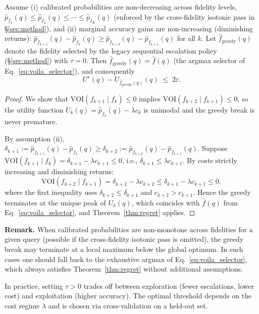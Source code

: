 \begin{corollary}
\label{cor:greedy_regret}
Assume (i) calibrated probabilities are non-decreasing across fidelity levels,
$\hat p_{f_1}(q) \le \hat p_{f_2}(q) \le \cdots \le \hat p_{f_K}(q)$
(enforced by the cross-fidelity isotonic pass in \S\ref{sec:method}),
and (ii) marginal accuracy gains are non-increasing (diminishing returns):
$\hat p_{f_{k+1}}(q) - \hat p_{f_k}(q) \ge \hat p_{f_{k+2}}(q) - \hat p_{f_{k+1}}(q)$
for all $k$.
Let $\hat f_{\text{greedy}}(q)$ denote the fidelity selected by the legacy
sequential escalation policy (\S\ref{sec:method})
with $\tau = 0$. Then $\hat f_{\text{greedy}}(q) = \hat f(q)$ (the argmax selector of
Eq.~\eqref{eq:voila_selector}), and consequently
\[
U^\star(q) - U_{\hat f_{\text{greedy}}(q)}(q)
\;\le\;
2\varepsilon.
\]
\end{corollary}

\begin{proof}
We show that $\mathrm{VOI}(f_{k+1} \mid f_k) \le 0$ implies
$\mathrm{VOI}(f_{k+2} \mid f_{k+1}) \le 0$, so the utility function
$U_k(q) = \hat p_{f_k}(q) - \lambda c_k$ is unimodal and the greedy break
is never premature.

By assumption (ii), $\delta_{k+1} := \hat p_{f_{k+1}}(q) - \hat p_{f_k}(q) \ge
\delta_{k+2} := \hat p_{f_{k+2}}(q) - \hat p_{f_{k+1}}(q)$.
Suppose $\mathrm{VOI}(f_{k+1} \mid f_k) = \delta_{k+1} - \lambda c_{k+1} \le 0$,
i.e., $\delta_{k+1} \le \lambda c_{k+1}$.
By costs strictly increasing and diminishing returns:
\[
\mathrm{VOI}(f_{k+2} \mid f_{k+1})
= \delta_{k+2} - \lambda c_{k+2}
\le \delta_{k+1} - \lambda c_{k+1}
\le 0,
\]
where the first inequality uses $\delta_{k+2} \le \delta_{k+1}$ and $c_{k+2} > c_{k+1}$.
Hence the greedy terminates at the unique peak of $U_k(q)$,
which coincides with $\hat f(q)$ from Eq.~\eqref{eq:voila_selector},
and Theorem~\ref{thm:regret} applies.
\end{proof}

\noindent
\textbf{Remark.}
When calibrated probabilities are non-monotone across fidelities for a given query
(possible if the cross-fidelity isotonic pass is omitted), the greedy break may
terminate at a local maximum below the global optimum.
In such cases one should fall back to the exhaustive argmax of Eq.~\eqref{eq:voila_selector},
which always satisfies Theorem~\ref{thm:regret} without additional assumptions.

\noindent
In practice, setting $\tau > 0$ trades off between exploration (fewer escalations, lower cost)
and exploitation (higher accuracy). The optimal threshold depends on the cost regime $\lambda$
and is chosen via cross-validation on a held-out set.

